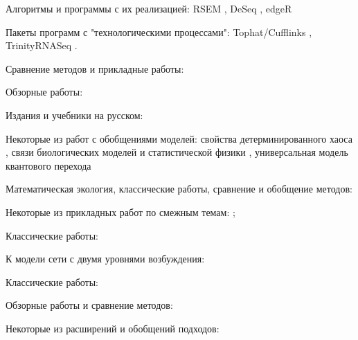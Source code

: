 Алгоритмы и программы с их реализацией: RSEM \parencite{Li_2011}, DeSeq \parencite{Anders_2010}, edgeR \parencite{Robinson_2010}

Пакеты программ с "технологическими процессами":  Tophat/Cufflinks \parencite{Trapnell_2012}, TrinityRNASeq \parencite{Grabherr_2011}.

Сравнение методов и прикладные работы: \cite{Anglicheau_2009,Chen_2016,Won_2014,Adamska_2007,Anavy_2014,Levin_2016}


Обзорные работы: \cite{Rattan_2006,Wu_2016,deSouza_2015,Cumming_2009}


Издания и учебники на русском: \cite{ТимофеевРесовский_1969,Марчук_1991,Ризниченко_2003}

Некоторые из работ с обобщениями моделей: свойства детерминированного хаоса \parencite{Feigenbaum_1983}, связи биологических моделей и статистической физики \parencite{Svirezhev_2000}, универсальная модель квантового перехода \parencite{DeGrandi_2010}

Математическая экология, классические работы, сравнение и обобщение методов: \cite{Preston_1948,Whittaker_1960,Hill_1973,Marrugan_2004,Jost_2006,McGill_2007,Wittebole_2009,Eliazar_2012,Chiu_2014,Chao_2014}

Некоторые из прикладных работ по смежным темам: \cite{Остапеня_1985,Владыко_2001,Владыко_2012}; \cite{Belikov_2005,Marchenkov_2018}


Классические работы: \cite{Hebb_1949,Rosenblatt_1957,Kohonen_1982,Hopfield_1985}

К модели сети с двумя уровнями возбуждения: \cite{Lodish_2000,Picciotto_2012,Belousov_2001,Irving_1992,Paulus_2016,BenAri_2014,Sum_1999}


Классические работы: \cite{Mandelbrot_1960,Mandelbrot_1967,Peng_1994,Richardson_1961,Higuchi_1988}

Обзорные работы и сравнение методов: \cite{Harte_2001,Jelinek_1998,Karbauskaite_2016,Seuront_2015}

Некоторые из расширений и обобщений подходов: \cite{Yakovenko_2009,Xu_2017,Sornette_2002,Rak_2007}


